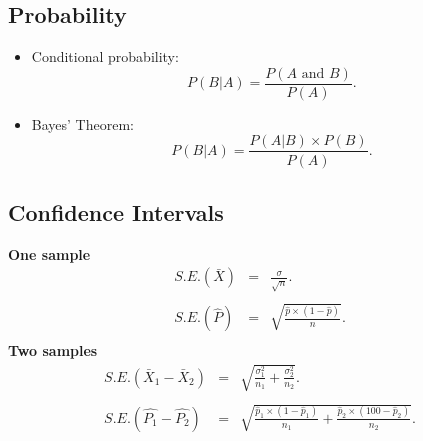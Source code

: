 \documentclass[a4paper,12pt]{article}
\begin{document}
\subsection*{Probability}
\begin{itemize}
	
	\item Conditional probability:
	\begin{equation*}
	P(B|A)=\frac{P\left( A\text{ and }B\right) }{P\left( A\right) }.
	\end{equation*}
	
	
	\item Bayes' Theorem:
	\begin{equation*}
	P(B|A)=\frac{P\left(A|B\right) \times P(B) }{P\left( A\right) }.
	\end{equation*}
	
	
	
	
\end{itemize}

\subsection*{Confidence Intervals}
{\bf One sample}
\begin{eqnarray*} S.E.(\bar{X})&=&\frac{\sigma}{\sqrt{n}}.\\\\
	S.E.(\hat{P})&=&\sqrt{\frac{\hat{p}\times(1-\hat{p})}{n}}.\\
\end{eqnarray*}
{\bf Two samples}
\begin{eqnarray*}
	S.E.(\bar{X}_1-\bar{X}_2)&=&\sqrt{\frac{\sigma^2_1}{n_1}+\frac{\sigma_2^2}{n_2}}.\\\\
	S.E.(\hat{P_1}-\hat{P_2})&=&\sqrt{\frac{\hat{p}_1\times(1-\hat{p}_1)}{n_1}+\frac{\hat{p}_2\times(100-\hat{p}_2)}{n_2}}.\\\\
\end{eqnarray*}
\end{document}
